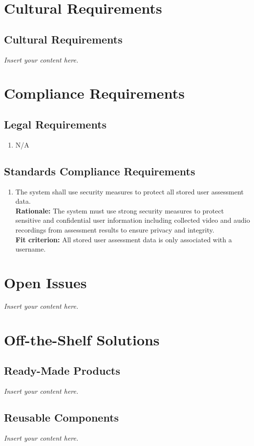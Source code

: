 \documentclass[12pt]{article}
\newcommand{\lips}{\textit{Insert your content here.}}
\begin{document}
\section{Cultural Requirements}
\subsection{Cultural Requirements}
\lips

\section{Compliance Requirements}
\subsection{Legal Requirements}
\begin{enumerate}[{CR-LR}1. ]
  \item N/A
\end{enumerate}
\subsection{Standards Compliance Requirements}
\begin{enumerate}[{CR-STD}1. ]
  \item The system shall use security measures to protect all stored user assessment data.\\
  \textbf{Rationale: }The system must use strong security measures to protect sensitive and confidential user information including collected video and audio recordings from assessment results to ensure privacy and integrity.\\
  \textbf{Fit criterion: }All stored user assessment data is only associated with a username. 

\end{enumerate}

\section{Open Issues}
\lips

\section{Off-the-Shelf Solutions}
\subsection{Ready-Made Products}
\lips
\subsection{Reusable Components}
\lips
\end{document}
